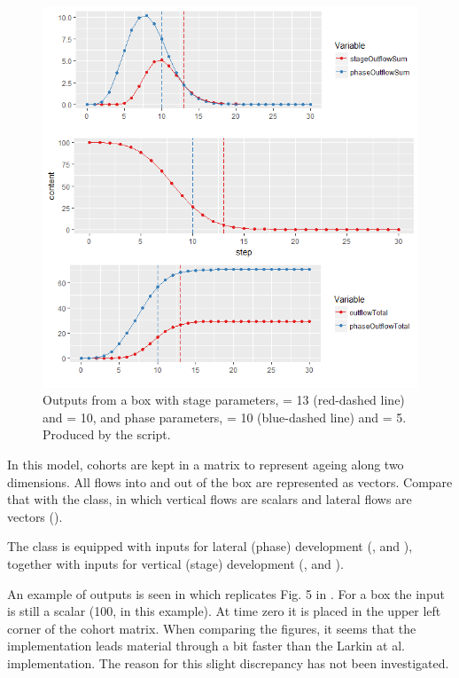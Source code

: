 \begin{figure} [ht]
\centering
\includegraphics[width=.9\textwidth]{graphics/phys-dev-4}
\caption{Outputs from a  box with stage parameters,  = 13 (red-dashed line) and  = 10, and phase parameters,  = 10 (blue-dashed line) and  = 5. Produced by the  script.} 
\label{fig:phys-dev-4}
\end{figure}

In this model, cohorts are kept in a matrix to represent ageing along two dimensions. All flows into and out of the box are represented as vectors. Compare that with the  class, in which vertical flows are scalars and lateral flows are vectors ().
 
The  class is equipped with inputs for  lateral (phase) development (,  and ), together with inputs for vertical (stage) development (,  and ).
 
An example of  outputs is seen in  which replicates Fig. 5 in \citet{Larkin00}. For a  box the  input is still a scalar (100, in this example). At time zero it is placed in the upper left corner of the cohort matrix. When comparing the figures, it seems that the  implementation leads material through a bit faster than the Larkin at al. implementation. The reason for this slight discrepancy has not been investigated.  

